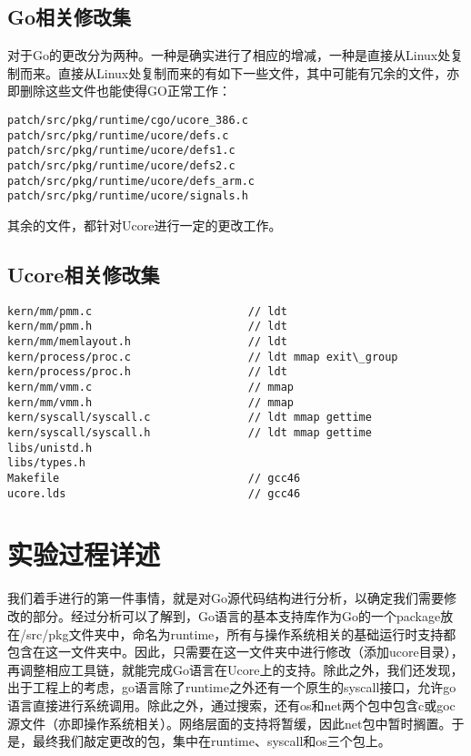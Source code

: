 \documentclass{article}
\begin{document}
\subsection{Go相关修改集}
对于Go的更改分为两种。一种是确实进行了相应的增减，一种是直接从Linux处复制而来。直接从Linux处复制而来的有如下一些文件，其中可能有冗余的文件，亦即删除这些文件也能使得GO正常工作：
\begin{lstlisting}
patch/src/pkg/runtime/cgo/ucore_386.c
patch/src/pkg/runtime/ucore/defs.c
patch/src/pkg/runtime/ucore/defs1.c
patch/src/pkg/runtime/ucore/defs2.c
patch/src/pkg/runtime/ucore/defs_arm.c
patch/src/pkg/runtime/ucore/signals.h
\end{lstlisting}

其余的文件，都针对Ucore进行一定的更改工作。

\subsection{Ucore相关修改集}

\begin{lstlisting}
kern/mm/pmm.c                        // ldt
kern/mm/pmm.h                        // ldt
kern/mm/memlayout.h                  // ldt
kern/process/proc.c                  // ldt mmap exit\_group
kern/process/proc.h                  // ldt
kern/mm/vmm.c                        // mmap
kern/mm/vmm.h                        // mmap
kern/syscall/syscall.c               // ldt mmap gettime
kern/syscall/syscall.h               // ldt mmap gettime
libs/unistd.h
libs/types.h
Makefile                             // gcc46
ucore.lds                            // gcc46
\end{lstlisting}

\section{实验过程详述}

我们着手进行的第一件事情，就是对Go源代码结构进行分析，以确定我们需要修改的部分。经过分析可以了解到，Go语言的基本支持库作为Go的一个package放在/src/pkg文件夹中，命名为runtime，所有与操作系统相关的基础运行时支持都包含在这一文件夹中。因此，只需要在这一文件夹中进行修改（添加ucore目录），再调整相应工具链，就能完成Go语言在Ucore上的支持。除此之外，我们还发现，出于工程上的考虑，go语言除了runtime之外还有一个原生的syscall接口，允许go语言直接进行系统调用。除此之外，通过搜索，还有os和net两个包中包含c或goc源文件（亦即操作系统相关）。网络层面的支持将暂缓，因此net包中暂时搁置。于是，最终我们敲定更改的包，集中在runtime、syscall和os三个包上。
\end{document}
